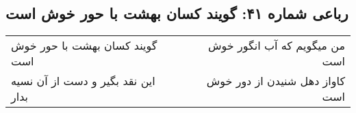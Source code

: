\begin{center}
\section*{رباعی شماره ۴۱: گویند کسان بهشت با حور خوش است}
\label{sec:sh041}
\begin{longtable}{l p{0.5cm} r}
گویند کسان بهشت با حور خوش است
&&
من میگویم که آب انگور خوش است
\\
این نقد بگیر و دست از آن نسیه بدار
&&
کاواز دهل شنیدن از دور خوش است
\\
\end{longtable}
\end{center}
